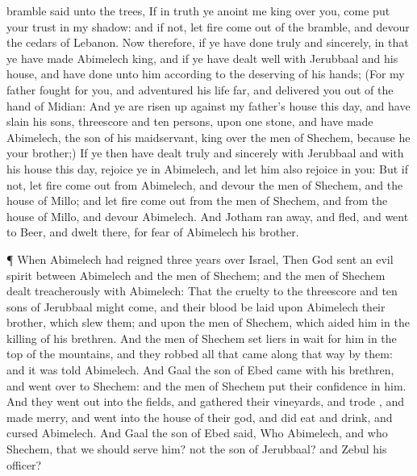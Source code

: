 {bramble
said unto the
trees, If in
truth ye
anoint me
king over you,
{}
come
{} put your
trust in my
shadow: and if not, let
fire come
out of the
bramble, and
devour the
cedars of
Lebanon.
Now therefore, if ye have
done
truly and
sincerely, in that ye have made
Abimelech
king, and if ye have
dealt
well with
Jerubbaal and his
house, and have
done unto him according to the
deserving of his
hands;
(For my
father
fought for you, and
adventured his
life
far, and
delivered you out of the
hand of
Midian:
And ye are risen
up against my
father’s
house this
day, and have
slain his
sons, threescore and
ten
persons, upon
one
stone, and have made
Abimelech, the
son of his
maidservant,
king over the
men of
Shechem, because he
{} your
brother;)
If ye then have
dealt
truly and
sincerely with
Jerubbaal and with his
house this
day,
{}
rejoice ye in
Abimelech, and let him also
rejoice in you:
But if not, let
fire come
out from
Abimelech, and
devour the
men of
Shechem, and the
house of
Millo; and let
fire come
out from the
men of
Shechem, and from the
house of
Millo, and
devour
Abimelech.
And
Jotham ran
away, and
fled, and
went to
Beer, and
dwelt there, for
fear of
Abimelech his
brother.
\par }{\PP {}¶ When
Abimelech had
reigned
three
years over
Israel,
Then
God
sent an
evil
spirit between
Abimelech and the
men of
Shechem; and the
men of
Shechem dealt
treacherously with
Abimelech:
That the
cruelty
{} to the threescore and
ten
sons of
Jerubbaal might
come, and their
blood be
laid upon
Abimelech their
brother, which
slew them; and upon the
men of
Shechem, which
aided him in the
killing of his
brethren.
And the
men of
Shechem
set liers in
wait for him in the
top of the
mountains, and they
robbed all that
came along that
way by them: and it was
told
Abimelech.
And
Gaal the
son of
Ebed
came with his
brethren, and went
over to
Shechem: and the
men of
Shechem put their
confidence in him.
And they went
out into the
fields, and
gathered their
vineyards, and
trode
{}, and
made
merry, and
went into the
house of their
god, and did
eat and
drink, and
cursed
Abimelech.
And
Gaal the
son of
Ebed
said, Who
{}
Abimelech, and who
{}
Shechem, that we should
serve him?
{} not
{} the
son of
Jerubbaal? and
Zebul his
officer?
}
